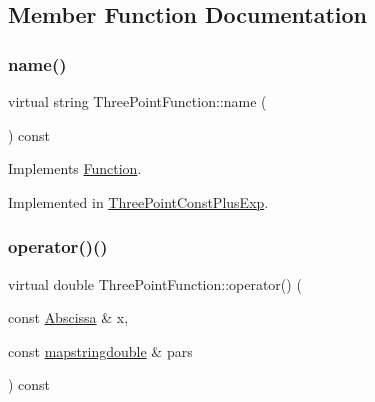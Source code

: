 \subsection{Member Function Documentation}
\mbox{\label{classThreePointFunction_a4231093b53df2f82f4821a663ac8249f}} 
\subsubsection{\texorpdfstring{name()}{name()}}
{\footnotesize\ttfamily virtual string Three\+Point\+Function\+::name (\begin{DoxyParamCaption}{ }\end{DoxyParamCaption}) const\hspace{0.3cm}{\ttfamily [pure virtual]}}



Implements \mbox{\hyperlink{classFunction_ac6dc83996d6f002141a0a0f66f2c6496}{Function}}.



Implemented in \mbox{\hyperlink{classThreePointConstPlusExp_ad7943ef83c3c7b511612e030797ece4a}{Three\+Point\+Const\+Plus\+Exp}}.

\mbox{\label{classThreePointFunction_a02550dd7bdee83aab6967d304bb40ff1}} 
\subsubsection{\texorpdfstring{operator()()}{operator()()}\hspace{0.1cm}{\footnotesize\ttfamily [1/2]}}
{\footnotesize\ttfamily virtual double Three\+Point\+Function\+::operator() (\begin{DoxyParamCaption}\item[{const \mbox{\hyperlink{classAbscissa}{Abscissa}} \&}]{x,  }\item[{const \mbox{\hyperlink{lib_2fitting__lib_2includes_8h_a647b481c557c7966517f753340a81d13}{mapstringdouble}} \&}]{pars }\end{DoxyParamCaption}) const\hspace{0.3cm}{\ttfamily [pure virtual]}}



